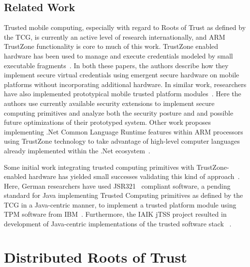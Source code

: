 \documentclass[10pt,letterpaper]{article}
\begin{document}
\subsection{Related Work}
Trusted mobile computing, especially with regard to Roots of Trust as defined by the TCG, is currently an active level of research internationally, and ARM TrustZone functionality is core to much of this work.  TrustZone enabled hardware has been used to manage and execute credentials modeled by small executable fragments~\cite{Ekberg08,Kostiainen09}.  In both these papers, the authors describe how they implement secure virtual credentials using emergent secure hardware on mobile platforms without incorporating additional hardware.  In similar work, researchers have also implemented prototypical mobile trusted platform modules~\cite{Ekberg09}.  Here the authors use currently available security extensions to implement secure computing primitives and analyze both the security posture and and possible future optimizations of their prototyped system.  Other work proposes implementing .Net Common Language Runtime features within ARM processors using TrustZone technology to take advantage of high-level computer languages already implemented within the .Net ecosystem~\cite{Santos11}.

Some initial work integrating trusted computing primitives with TrustZone-enabled hardware has yielded small successes validating this kind of approach~\cite{Winter11}.  Here, German researchers have used JSR321~\cite{JSR321} compliant software, a pending standard for Java implementing Trusted Computing primitives as defined by the TCG in a Java-centric manner, to implement a trusted platform module using TPM software from IBM~\cite{IBM-TPM}. Furthermore, the IAIK jTSS project resulted in development of Java-centric implementations of the trusted software stack ~\cite{TrustedJava}.

\section{Distributed Roots of Trust}
\end{document}
